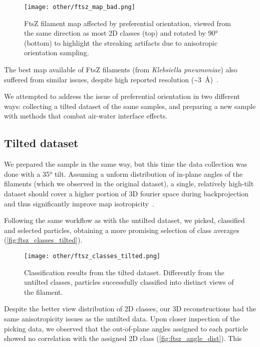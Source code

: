\begin{figure}[ht]
    \centering
    \texttt{[image: other/ftsz\_map\_bad.png]}
    \caption[FtsZ filament: anisotropic map]{FtsZ filament map affected by preferential orientation, viewed from the same direction as most 2D classes (top) and rotated by \ang{90} (bottom) to highlight the streaking artifacts due to anisotropic orientation sampling.}
    \label{fig:ftsz_map_bad}
\end{figure}

The best map available of FtsZ filaments (from \textit{Klebsiella pneumoniae}) also suffered from similar issues, despite high reported resolution (\sim\qty{3}{\angstrom})~\cite{fujitaStructuresFtsZSingle2023}.

We attempted to address the issue of preferential orientation in two different ways: collecting a tilted dataset of the same samples, and preparing a new sample with methods that combat air-water interface effects.

\subsection{Tilted dataset}\label{ftsz_tilted}

We prepared the sample in the same way, but this time the data collection was done with a \ang{35} tilt.
Assuming a unform distribution of in-plane angles of the filaments (which we observed in the original dataset), a single, relatively high-tilt dataset should cover a higher portion of 3D fourier space during backprojection and thus significantly improve map isotropicity~\cite{tanAddressingPreferredSpecimen2017}.

Following the same workflow as with the untilted dataset, we picked, classified and selected particles, obtaining a more promising selection of class averages (\autoref{fig:ftsz_classes_tilted}).

\begin{figure}[ht]
    \centering
    \texttt{[image: other/ftsz\_classes\_tilted.png]}
    \caption[FtsZ tilted dataset: 2D classes]{Classification results from the tilted dataset. Differently from the untilted classes, particles successfully classified into distinct views of the filament.}
    \label{fig:ftsz_classes_tilted}
\end{figure}

Despite the better view distribution of 2D classes, our 3D reconstructions had the same anisotropicity issues as the untilted data.
Upon closer inspection of the picking data, we observed that the out-of-plane angles assigned to each particle showed no correlation with the assigned 2D class (\autoref{fig:ftsz_angle_dist}).
This

